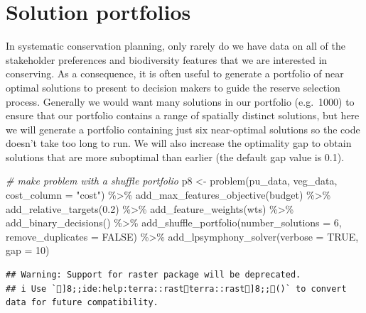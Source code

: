 \documentclass[
  12pt,
]{book}
\newenvironment{Shaded}{\begin{snugshade}}{\end{snugshade}}
\newcommand{\AttributeTok}[1]{\textcolor[rgb]{0.77,0.63,0.00}{#1}}
\newcommand{\CommentTok}[1]{\textcolor[rgb]{0.56,0.35,0.01}{\textit{#1}}}
\newcommand{\ConstantTok}[1]{\textcolor[rgb]{0.00,0.00,0.00}{#1}}
\newcommand{\DecValTok}[1]{\textcolor[rgb]{0.00,0.00,0.81}{#1}}
\newcommand{\FloatTok}[1]{\textcolor[rgb]{0.00,0.00,0.81}{#1}}
\newcommand{\FunctionTok}[1]{\textcolor[rgb]{0.00,0.00,0.00}{#1}}
\newcommand{\NormalTok}[1]{#1}
\newcommand{\OtherTok}[1]{\textcolor[rgb]{0.56,0.35,0.01}{#1}}
\newcommand{\SpecialCharTok}[1]{\textcolor[rgb]{0.00,0.00,0.00}{#1}}
\newcommand{\StringTok}[1]{\textcolor[rgb]{0.31,0.60,0.02}{#1}}
\begin{document}
\hypertarget{solution-portfolios}{%
\section{Solution portfolios}\label{solution-portfolios}}

In systematic conservation planning, only rarely do we have data on all of the stakeholder preferences and biodiversity features that we are interested in conserving. As a consequence, it is often useful to generate a portfolio of near optimal solutions to present to decision makers to guide the reserve selection process. Generally we would want many solutions in our portfolio (e.g.~1000) to ensure that our portfolio contains a range of spatially distinct solutions, but here we will generate a portfolio containing just six near-optimal solutions so the code doesn't take too long to run. We will also increase the optimality gap to obtain solutions that are more suboptimal than earlier (the default gap value is 0.1).

\begin{Shaded}
\begin{Highlighting}[]
\CommentTok{\# make problem with a shuffle portfolio}
\NormalTok{p8 }\OtherTok{\textless{}{-}} \FunctionTok{problem}\NormalTok{(pu\_data, veg\_data, }\AttributeTok{cost\_column =} \StringTok{"cost"}\NormalTok{) }\SpecialCharTok{\%\textgreater{}\%}
      \FunctionTok{add\_max\_features\_objective}\NormalTok{(budget) }\SpecialCharTok{\%\textgreater{}\%}
      \FunctionTok{add\_relative\_targets}\NormalTok{(}\FloatTok{0.2}\NormalTok{) }\SpecialCharTok{\%\textgreater{}\%}
      \FunctionTok{add\_feature\_weights}\NormalTok{(wts) }\SpecialCharTok{\%\textgreater{}\%}
      \FunctionTok{add\_binary\_decisions}\NormalTok{() }\SpecialCharTok{\%\textgreater{}\%}
      \FunctionTok{add\_shuffle\_portfolio}\NormalTok{(}\AttributeTok{number\_solutions =} \DecValTok{6}\NormalTok{,}
                            \AttributeTok{remove\_duplicates =} \ConstantTok{FALSE}\NormalTok{) }\SpecialCharTok{\%\textgreater{}\%}
      \FunctionTok{add\_lpsymphony\_solver}\NormalTok{(}\AttributeTok{verbose =} \ConstantTok{TRUE}\NormalTok{, }\AttributeTok{gap =} \DecValTok{10}\NormalTok{)}
\end{Highlighting}
\end{Shaded}

\begin{verbatim}
## Warning: Support for raster package will be deprecated.
## i Use `]8;;ide:help:terra::rastterra::rast]8;;()` to convert data for future compatibility.
\end{verbatim}
\end{document}
